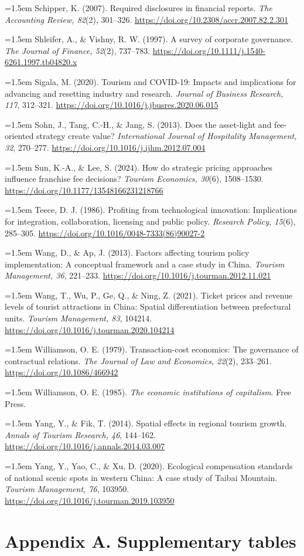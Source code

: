 \documentclass[review,3p,times]{elsarticle}
\def\refitem#1{\noindent\hangindent=1.5em\hangafter=1 #1\par\medskip}
\begin{document}
\refitem{Schipper, K. (2007). Required disclosures in financial reports. \emph{The Accounting Review, 82}(2), 301--326. \url{https://doi.org/10.2308/accr.2007.82.2.301}}
\refitem{Shleifer, A., \& Vishny, R. W. (1997). A survey of corporate governance. \emph{The Journal of Finance, 52}(2), 737--783. \url{https://doi.org/10.1111/j.1540-6261.1997.tb04820.x}}
\refitem{Sigala, M. (2020). Tourism and COVID-19: Impacts and implications for advancing and resetting industry and research. \emph{Journal of Business Research, 117}, 312--321. \url{https://doi.org/10.1016/j.jbusres.2020.06.015}}
\refitem{Sohn, J., Tang, C.-H., \& Jang, S. (2013). Does the asset-light and fee-oriented strategy create value? \emph{International Journal of Hospitality Management, 32}, 270--277. \url{https://doi.org/10.1016/j.ijhm.2012.07.004}}
\refitem{Sun, K.-A., \& Lee, S. (2024). How do strategic pricing approaches influence franchise fee decisions? \emph{Tourism Economics, 30}(6), 1508--1530. \url{https://doi.org/10.1177/13548166231218766}}
\refitem{Teece, D. J. (1986). Profiting from technological innovation: Implications for integration, collaboration, licensing and public policy. \emph{Research Policy, 15}(6), 285--305. \url{https://doi.org/10.1016/0048-7333(86)90027-2}}
\refitem{Wang, D., \& Ap, J. (2013). Factors affecting tourism policy implementation: A conceptual framework and a case study in China. \emph{Tourism Management, 36}, 221--233. \url{https://doi.org/10.1016/j.tourman.2012.11.021}}
\refitem{Wang, T., Wu, P., Ge, Q., \& Ning, Z. (2021). Ticket prices and revenue levels of tourist attractions in China: Spatial differentiation between prefectural units. \emph{Tourism Management, 83}, 104214. \url{https://doi.org/10.1016/j.tourman.2020.104214}}
\refitem{Williamson, O. E. (1979). Transaction-cost economics: The governance of contractual relations. \emph{The Journal of Law and Economics, 22}(2), 233--261. \url{https://doi.org/10.1086/466942}}
\refitem{Williamson, O. E. (1985). \emph{The economic institutions of capitalism}. Free Press.}
\refitem{Yang, Y., \& Fik, T. (2014). Spatial effects in regional tourism growth. \emph{Annals of Tourism Research, 46}, 144--162. \url{https://doi.org/10.1016/j.annals.2014.03.007}}
\refitem{Yang, Y., Yao, C., \& Xu, D. (2020). Ecological compensation standards of national scenic spots in western China: A case study of Taibai Mountain. \emph{Tourism Management, 76}, 103950. \url{https://doi.org/10.1016/j.tourman.2019.103950}}

\clearpage
\section*{Appendix A. Supplementary tables}
\end{document}
